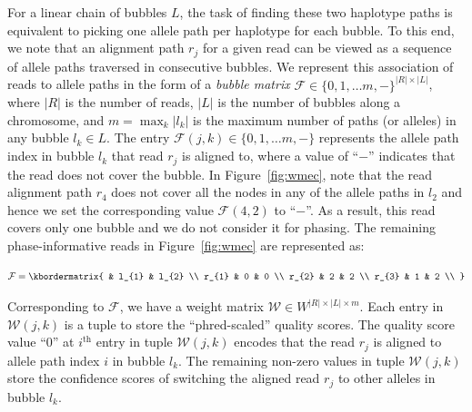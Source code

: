 For a linear chain of bubbles $L$, the task of finding these two haplotype paths is equivalent to picking one allele path per haplotype for each bubble.
To this end, we note that an alignment path $r_j$ for a given read can be viewed as a sequence of allele paths traversed in consecutive bubbles. 
We represent this association of reads to allele paths in the form of a \emph{bubble matrix} $\mathcal{F}\in\{0,1, \ldots m, -\}^{|R|\times |L|}$, where $|R|$ is the number of reads, $|L|$ is the number of bubbles along a chromosome, and $m = \max_k|l_k|$ is the maximum number of  paths (or alleles) in any bubble $l_k\in L$.
The entry $\mathcal{F}(j,k) \in \{0, 1, \ldots m, -\}$ represents the allele path index in bubble $l_k$ that read $r_j$ is aligned to, where a value of ``$-$'' indicates that the read does not cover the bubble.
In Figure~\ref{fig:wmec}, note that the read alignment path $r_4$ does not cover all the nodes in any of the allele paths in $l_2$ and hence we set the corresponding value $\mathcal{F}(4,2)$ to ``$-$''.
As a result, this read covers only one bubble and we do not consider it for phasing.
The remaining phase-informative reads in Figure~\ref{fig:wmec} are represented as:

\begin{equation}\label{eq:bubble_matrix}
  \mathcal{F}  = \kbordermatrix{
     & l_{1}       & l_{2}  \\
    r_{1}       & 0 & 0 \\
    r_{2}       & 2 & 2 \\
    r_{3}       & 1 & 2 \\
  }
\end{equation}

Corresponding to $\mathcal{F}$, we have a weight matrix $\mathcal{W}\in W^{|R|\times |L|\times m}$. %
Each entry in $\mathcal{W}(j,k)$ is a tuple to store the ``phred-scaled'' quality scores.
The quality score value ``0'' at $i^\text{th}$ entry in tuple $\mathcal{W}(j,k)$ encodes that the read $r_j$ is aligned to allele path index $i$ in bubble $l_k$.
The remaining non-zero values in tuple $\mathcal{W}(j,k)$ store the confidence scores of switching the aligned read $r_j$ to other alleles in bubble $l_k$.

